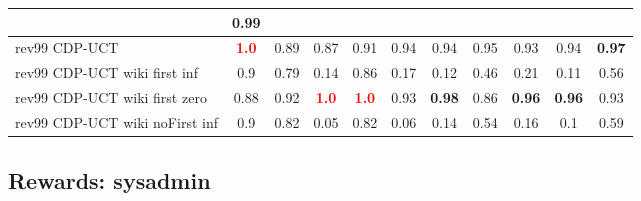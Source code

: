 \documentclass{article}
\begin{document}
\begin{tabular}{|l|r@{$\pm$}rr@{$\pm$}rr@{$\pm$}rr@{$\pm$}rr@{$\pm$}rr@{$\pm$}rr@{$\pm$}rr@{$\pm$}rr@{$\pm$}rr@{$\pm$}r|}
& \multicolumn{2}{c|}{0.99}
\\
\hline
rev99 CDP-UCT
& \multicolumn{2}{c}{\textbf{\textcolor{red}{1.0}}}
& \multicolumn{2}{c}{0.89}
& \multicolumn{2}{c}{0.87}
& \multicolumn{2}{c}{0.91}
& \multicolumn{2}{c}{0.94}
& \multicolumn{2}{c}{0.94}
& \multicolumn{2}{c}{0.95}
& \multicolumn{2}{c}{0.93}
& \multicolumn{2}{c}{0.94}
& \multicolumn{2}{c|}{\textbf{0.97}}
\\
rev99 CDP-UCT wiki first inf
& \multicolumn{2}{c}{0.9}
& \multicolumn{2}{c}{0.79}
& \multicolumn{2}{c}{0.14}
& \multicolumn{2}{c}{0.86}
& \multicolumn{2}{c}{0.17}
& \multicolumn{2}{c}{0.12}
& \multicolumn{2}{c}{0.46}
& \multicolumn{2}{c}{0.21}
& \multicolumn{2}{c}{0.11}
& \multicolumn{2}{c|}{0.56}
\\
rev99 CDP-UCT wiki first zero
& \multicolumn{2}{c}{0.88}
& \multicolumn{2}{c}{0.92}
& \multicolumn{2}{c}{\textbf{\textcolor{red}{1.0}}}
& \multicolumn{2}{c}{\textbf{\textcolor{red}{1.0}}}
& \multicolumn{2}{c}{0.93}
& \multicolumn{2}{c}{\textbf{0.98}}
& \multicolumn{2}{c}{0.86}
& \multicolumn{2}{c}{\textbf{0.96}}
& \multicolumn{2}{c}{\textbf{0.96}}
& \multicolumn{2}{c|}{0.93}
\\
rev99 CDP-UCT wiki noFirst inf
& \multicolumn{2}{c}{0.9}
& \multicolumn{2}{c}{0.82}
& \multicolumn{2}{c}{0.05}
& \multicolumn{2}{c}{0.82}
& \multicolumn{2}{c}{0.06}
& \multicolumn{2}{c}{0.14}
& \multicolumn{2}{c}{0.54}
& \multicolumn{2}{c}{0.16}
& \multicolumn{2}{c}{0.1}
& \multicolumn{2}{c|}{0.59}
\\
\hline
\end{tabular}%

\bigskip

\subsection*{Rewards: sysadmin}
\end{document}
